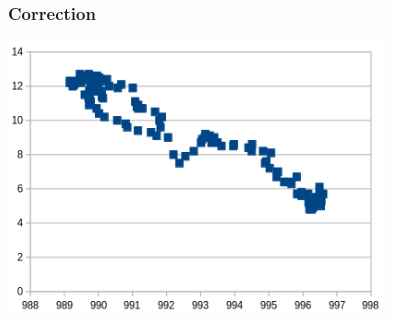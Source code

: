 \documentclass[svgnames,11pt]{beamer}
\begin{document}
\begin{frame}
    \frametitle{Correction}

    \begin{center}
    \centering
    \includegraphics[width=10cm]{ressources/nuage.png}
    \label{IMG}
    \end{center}

\end{frame}
\end{document}

